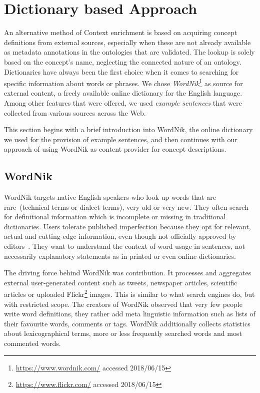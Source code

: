 
\section{Dictionary based Approach}\label{sec:external_source}
An alternative method of Context enrichment is based on acquiring concept definitions from external sources, especially when these are not already available as metadata annotations in the ontologies that are validated. The lookup is solely based on the concept's name, neglecting the connected nature of an ontology. Dictionaries have always been the first choice when it comes to searching for specific information about words or phrases. We chose \textit{WordNik}\footnote{\url{https://www.wordnik.com/} accessed 2018/06/15} as source for external content, a freely available online dictionary for the English language. Among other features that were offered, we used \emph{example sentences} that were collected from various sources across the Web. 

This section begins with a brief introduction into WordNik, the online dictionary we used for the provision of example sentences, and then continues with our approach of using WordNik as content provider for concept descriptions.   


\subsection{WordNik}\label{sec:wordnik}
WordNik targets native English speakers who look up words that are rare~(technical terms or dialect terms), very old or very new. They often search for definitional information which is incomplete or missing in traditional dictionaries. Users tolerate published imperfection because they opt for relevant, actual and cutting-edge information, even though not officially approved by editors~\cite{burnett1979}. They want to understand the context of word usage in sentences, not necessarily explanatory statements as in printed or even online dictionaries.

The driving force behind WordNik was contribution. It processes and aggregates external user-generated content such as tweets, newspaper articles, scientific articles or uploaded Flickr\footnote{\url{https://www.flickr.com/} accessed 2018/06/15} images. This is similar to what search engines do, but with restricted scope. The creators of WordNik observed that very few people write word definitions, they rather add meta linguistic information such as lists of their favourite words, comments or tags. WordNik additionally collects statistics about lexicographical terms, more or less frequently searched words and most commented words. 

